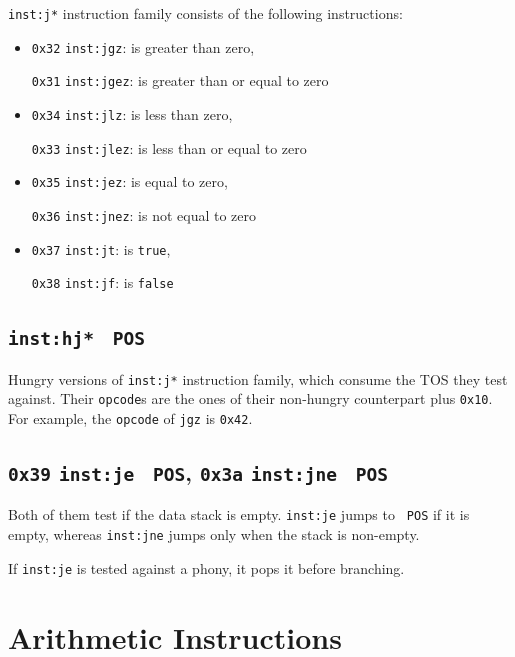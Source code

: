 \documentclass{report}
\newcommand{\mtilde}[1]{\textasciitilde}
\newcommand{\marg}[1]{\texttt{\mtilde ~#1}}
\newcommand{\inst}[1] {\texttt{inst:#1}}
\begin{document}
\inst{j*} instruction family consists of the following instructions:
\begin{itemize}
\item \texttt{0x32} \inst{jgz}:  is greater than zero,

\texttt{0x31} \inst{jgez}:  is greater than or equal to zero

\item \texttt{0x34} \inst{jlz}:  is less than zero,

\texttt{0x33} \inst{jlez}:  is less than or equal to zero

\item \texttt{0x35} \inst{jez}:  is equal to zero,

\texttt{0x36} \inst{jnez}:  is not equal to zero

\item \texttt{0x37} \inst{jt}:  is \texttt{true},

\texttt{0x38} \inst{jf}:  is \texttt{false}
\end{itemize}

\subsection{\inst{hj*} \marg{POS} }

Hungry versions of \inst{j*} instruction family, which consume the TOS they test against. Their \texttt{opcode}s are the ones of their non-hungry counterpart plus \texttt{0x10}. For example, the \texttt{opcode} of \texttt{jgz} is \texttt{0x42}.

\subsection{\texttt{0x39} \inst{je} \marg{POS}, \texttt{0x3a} \inst{jne} \marg{POS}}

Both of them test if the data stack is empty. \inst{je} jumps to \marg{POS} if it is empty, whereas \inst{jne} jumps only when the stack is non-empty.

\begin{mdframed}[style=detail]
  If \inst{je} is tested against a phony, it pops it before branching.
\end{mdframed}

\section{Arithmetic Instructions}
\end{document}
